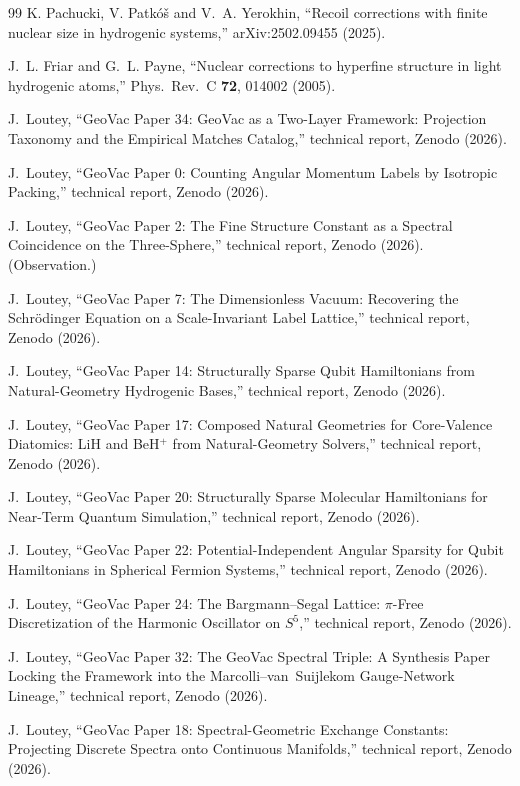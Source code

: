 \documentclass[twocolumn,prc,amsmath,amssymb,superscriptaddress]{revtex4-2}
\begin{document}
\begin{thebibliography}{99}
K. Pachucki, V. Patk\'o\v{s} and V.~A. Yerokhin,
``Recoil corrections with finite nuclear size in hydrogenic systems,''
arXiv:2502.09455 (2025).

J.~L. Friar and G.~L. Payne,
``Nuclear corrections to hyperfine structure in light hydrogenic atoms,''
Phys.~Rev.~C \textbf{72}, 014002 (2005).

J.~Loutey, ``GeoVac Paper 34: GeoVac as a Two-Layer Framework: Projection Taxonomy and the Empirical Matches Catalog,''
technical report, Zenodo (2026).

J.~Loutey, ``GeoVac Paper 0: Counting Angular Momentum Labels by Isotropic Packing,''
technical report, Zenodo (2026).

J.~Loutey, ``GeoVac Paper 2: The Fine Structure Constant as a Spectral Coincidence on the Three-Sphere,'' technical report, Zenodo (2026). (Observation.)

J.~Loutey, ``GeoVac Paper 7: The Dimensionless Vacuum: Recovering the Schr\"odinger Equation on a Scale-Invariant Label Lattice,''
technical report, Zenodo (2026).

J.~Loutey, ``GeoVac Paper 14: Structurally Sparse Qubit Hamiltonians from Natural-Geometry Hydrogenic Bases,''
technical report, Zenodo (2026).

J.~Loutey, ``GeoVac Paper 17: Composed Natural Geometries for Core-Valence Diatomics: LiH and BeH$^+$ from Natural-Geometry Solvers,'' technical report, Zenodo (2026).

J.~Loutey, ``GeoVac Paper 20: Structurally Sparse Molecular Hamiltonians for Near-Term Quantum Simulation,''
technical report, Zenodo (2026).

J.~Loutey, ``GeoVac Paper 22: Potential-Independent Angular Sparsity for Qubit Hamiltonians in Spherical Fermion Systems,''
technical report, Zenodo (2026).

J.~Loutey, ``GeoVac Paper 24: The Bargmann--Segal Lattice: $\pi$-Free Discretization of the Harmonic Oscillator on $S^5$,''
technical report, Zenodo (2026).

J.~Loutey, ``GeoVac Paper 32: The GeoVac Spectral Triple: A Synthesis Paper Locking the Framework into the Marcolli--van~Suijlekom Gauge-Network Lineage,''
technical report, Zenodo (2026).

J.~Loutey, ``GeoVac Paper 18: Spectral-Geometric Exchange Constants: Projecting Discrete Spectra onto Continuous Manifolds,'' technical report, Zenodo (2026).


\end{thebibliography}
\end{document}
